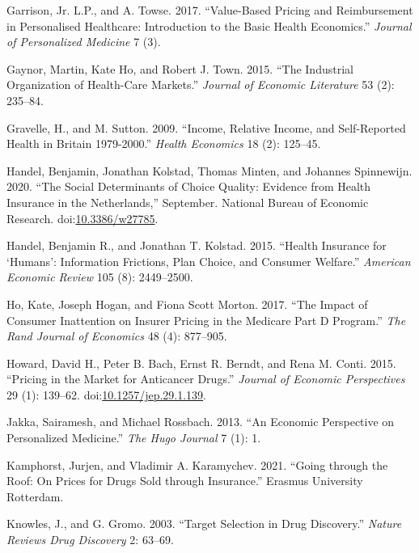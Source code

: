\documentclass[a4paper,12pt]{article}
\begin{document}
\hypertarget{citeproc_bib_item_17}{Garrison, Jr. L.P., and A. Towse. 2017. “Value-Based Pricing and Reimbursement in Personalised Healthcare: Introduction to the Basic Health Economics.” \textit{Journal of Personalized Medicine} 7 (3).}

\hypertarget{citeproc_bib_item_18}{Gaynor, Martin, Kate Ho, and Robert J. Town. 2015. “The Industrial Organization of Health-Care Markets.” \textit{Journal of Economic Literature} 53 (2): 235–84.}

\hypertarget{citeproc_bib_item_19}{Gravelle, H., and M. Sutton. 2009. “Income, Relative Income, and Self-Reported Health in Britain 1979-2000.” \textit{Health Economics} 18 (2): 125–45.}

\hypertarget{citeproc_bib_item_20}{Handel, Benjamin, Jonathan Kolstad, Thomas Minten, and Johannes Spinnewijn. 2020. “The Social Determinants of Choice Quality: Evidence from Health Insurance in the Netherlands,” September. National Bureau of Economic Research. doi:\href{https://doi.org/10.3386/w27785}{10.3386/w27785}.}

\hypertarget{citeproc_bib_item_21}{Handel, Benjamin R., and Jonathan T. Kolstad. 2015. “Health Insurance for ‘Humans’: Information Frictions, Plan Choice, and Consumer Welfare.” \textit{American Economic Review} 105 (8): 2449–2500.}

\hypertarget{citeproc_bib_item_22}{Ho, Kate, Joseph Hogan, and Fiona Scott Morton. 2017. “The Impact of Consumer Inattention on Insurer Pricing in the Medicare Part D Program.” \textit{The Rand Journal of Economics} 48 (4): 877–905.}

\hypertarget{citeproc_bib_item_23}{Howard, David H., Peter B. Bach, Ernst R. Berndt, and Rena M. Conti. 2015. “Pricing in the Market for Anticancer Drugs.” \textit{Journal of Economic Perspectives} 29 (1): 139–62. doi:\href{https://doi.org/10.1257/jep.29.1.139}{10.1257/jep.29.1.139}.}

\hypertarget{citeproc_bib_item_24}{Jakka, Sairamesh, and Michael Rossbach. 2013. “An Economic Perspective on Personalized Medicine.” \textit{The Hugo Journal} 7 (1): 1.}

\hypertarget{citeproc_bib_item_25}{Kamphorst, Jurjen, and Vladimir A. Karamychev. 2021. “Going through the Roof: On Prices for Drugs Sold through Insurance.” Erasmus University Rotterdam.}

\hypertarget{citeproc_bib_item_26}{Knowles, J., and G. Gromo. 2003. “Target Selection in Drug Discovery.” \textit{Nature Reviews Drug Discovery} 2: 63–69.}
\end{document}
